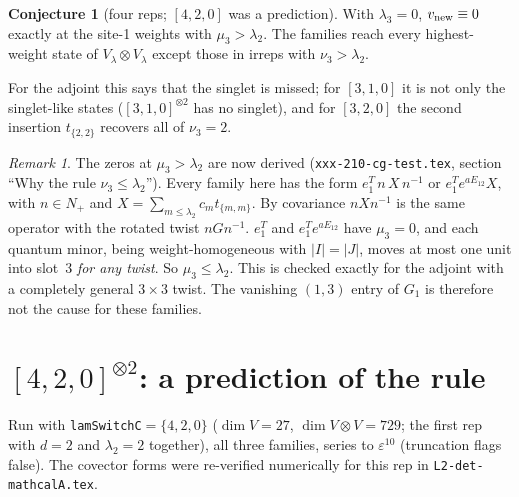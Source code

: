\documentclass[11pt]{article}
\newcommand{\nb}[1]{\texttt{#1}}
\theoremstyle{definition}
\newtheorem{conjecture}{Conjecture}
\theoremstyle{remark}
\newtheorem*{remark}{Remark}
\begin{document}
\begin{conjecture}[{four reps; $[4,2,0]$ was a prediction}]\label{conj:rule}
With $\lambda_3=0$, $v_{\rm new}\equiv0$ exactly at the site-1 weights with $\mu_3>\lambda_2$. The families reach every highest-weight state of $V_\lambda\otimes V_\lambda$ except those in irreps with $\nu_3>\lambda_2$.
\end{conjecture}
For the adjoint this says that the singlet is missed; for $[3,1,0]$ it is not only the singlet-like states ($[3,1,0]^{\otimes2}$ has no singlet), and for $[3,2,0]$ the second insertion $t_{\{2,2\}}$ recovers all of $\nu_3=2$.

\begin{remark}
The zeros at $\mu_3>\lambda_2$ are now derived (\nb{xxx-210-cg-test.tex}, section ``Why the rule $\nu_3\le\lambda_2$''). Every family here has the form $e_1^T\,n\,X\,n^{-1}$ or $e_1^Te^{aE_{12}}X$, with $n\in N_+$ and $X=\sum_{m\le\lambda_2}c_m t_{\{m,m\}}$. By covariance $nXn^{-1}$ is the same operator with the rotated twist $nGn^{-1}$. $e_1^T$ and $e_1^Te^{aE_{12}}$ have $\mu_3=0$, and each quantum minor, being weight-homogeneous with $|I|=|J|$, moves at most one unit into slot~3 \emph{for any twist}. So $\mu_3\le\lambda_2$. This is checked exactly for the adjoint with a completely general $3\times3$ twist. The vanishing $(1,3)$ entry of $G_1$ is therefore not the cause for these families.
\end{remark}

\section{$[4,2,0]^{\otimes2}$: a prediction of the rule}\label{sec:420}

Run with \nb{lamSwitchC}$=\{4,2,0\}$ ($\dim V=27$, $\dim V\otimes V=729$; the first rep with $d=2$ and $\lambda_2=2$ together), all three families, series to $\varepsilon^{10}$ (truncation flags false). The covector forms were re-verified numerically for this rep in \nb{L2-det-mathcalA.tex}.
\end{document}
